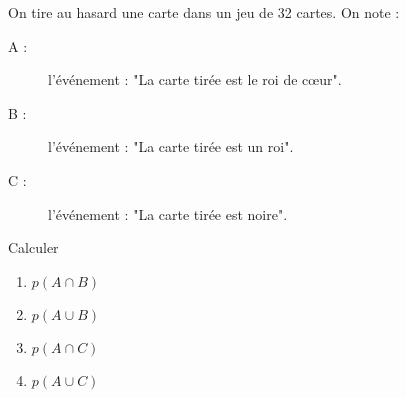 
On tire au hasard une carte dans un jeu de 32 cartes. On note :
\begin{description}
\item[A :] l'événement : "La carte tirée est le roi de cœur".
\item[B :] l'événement : "La carte tirée est un roi".
\item[C :] l'événement : "La carte tirée est noire".
\end{description}
Calculer 
\begin{enumerate}
\item $p(A \cap B)$
\item $p(A \cup B)$
\item $p(A \cap C)$
\item $p(A \cup C)$
\end{enumerate}

% 
% 
